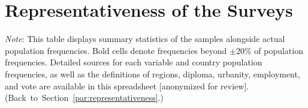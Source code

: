 

\clearpage
\section{Representativeness of the Surveys}\label{app:representativeness}

\begin{table}[h!]
    \caption[Sample representativeness in All, Eu, EU]{Sample representativeness overall, in Europe, and in the European Union. %
    } \label{tab:representativeness_0}
    \makebox[\textwidth][c]{
        \resizebox*{!}{.73\textheight}{%
        
        }
    }
    {\footnotesize \textit{Note}: This table displays summary statistics of the samples alongside actual population frequencies. Bold cells denote frequencies beyond $\pm 20\%$ of population frequencies. 
    Detailed sources for each variable and country population frequencies, as well as the definitions of regions, diploma, urbanity, employment, and vote are available in this spreadsheet [anonymized for review]. \hfill (Back~to~Section~\ref{par:representativeness}.) %
    } 
\end{table}

